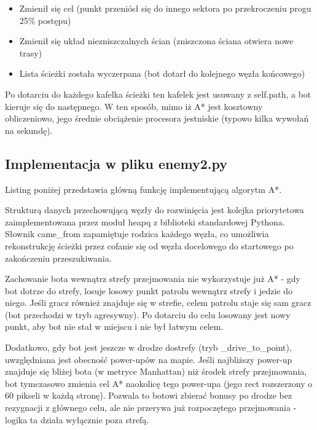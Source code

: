 \begin{itemize}
    \item Zmienił się cel (punkt przeniósł się do innego sektora po przekroczeniu progu 25\% postępu)
    \item Zmienił się układ niezniszczalnych ścian (zniszczona ściana otwiera nowe trasy)
    \item Lista ścieżki została wyczerpana (bot dotarł do kolejnego węzła końcowego)
\end{itemize}
 
Po dotarciu do każdego kafelka ścieżki ten kafelek jest usuwany z self.path, a bot kieruje się 
do następnego. W ten sposób, mimo iż A* jest kosztowny obliczeniowo, jego średnie obciążenie procesora 
jestniskie (typowo kilka wywołań na sekundę).

\subsection{Implementacja w pliku enemy2.py}

Listing poniżej przedstawia główną funkcję implementującą algorytm A*.


 
Strukturą danych przechowującą węzły do rozwinięcia jest kolejka priorytetowa zaimplementowana przez moduł heapq z biblioteki 
standardowej Pythona. Słownik came\_from zapamiętuje rodzica każdego węzła, co umożliwia rekonstrukcję ścieżki 
przez cofanie się od węzła docelowego do startowego po zakończeniu przeszukiwania.
 
Zachowanie bota wewnątrz strefy przejmowania nie wykorzystuje już A* - gdy bot dotrze do strefy, losuje losowy 
punkt patrolu wewnątrz strefy i jedzie do niego. Jeśli gracz również znajduje się w strefie, celem patrolu staje się 
sam gracz (bot przechodzi w tryb agresywny). Po dotarciu do celu losowany jest nowy punkt, aby bot nie stał w miejscu i nie 
był łatwym celem.
 
Dodatkowo, gdy bot jest jeszcze w drodze dostrefy (tryb \_drive\_to\_point), uwzględniana jest obecność power-upów 
na mapie. Jeśli najbliższy power-up znajduje się bliżej bota (w metryce Manhattan) niż środek strefy przejmowania, 
bot tymczasowo zmienia cel A* naokolicę tego power-upa (jego rect rozszerzony o 60 pikseli w każdą stronę). Pozwala 
to botowi zbierać bonusy po drodze bez rezygnacji z głównego celu, ale nie przerywa już rozpoczętego przejmowania - logika 
ta działa wyłącznie poza strefą.

